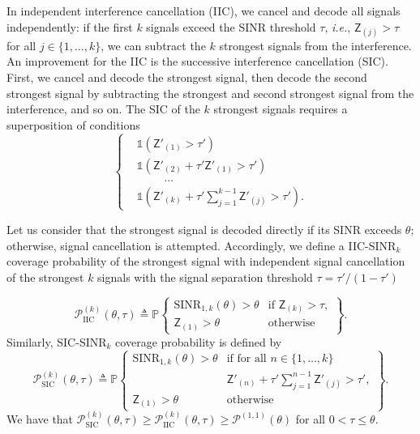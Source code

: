 \documentclass[lettersize,journal]{IEEEtran}
\begin{document}
In independent interference cancellation (IIC), we cancel and decode all signals independently: if the first $k$ signals exceed the SINR threshold $\tau$, \textit{i.e.}, $\mathsf{Z}_{(j)} > \tau$ for all $j \in \{1,\dots,k\}$, we can subtract the $k$ strongest signals from the interference. An improvement for the IIC is the successive interference cancellation (SIC). First, we cancel and decode the strongest signal, then decode the second strongest signal by subtracting the strongest and second strongest signal from the interference, and so on. The SIC of the $k$ strongest signals requires a superposition of conditions
\begin{equation}
  \label{eq:SIC-SINRcond}
  \begin{cases}
    &\mathds{1} \left(\mathsf{Z}'_{(1)} > \tau'\right)\\
    &\mathds{1}\left( \mathsf{Z}'_{(2)} + \tau' \mathsf{Z}'_{(1)}> \tau'\right) \\
    &\hspace{1cm}\dots \\
    &\mathds{1} \left(\mathsf{Z}'_{(k)} + \tau' \sum_{j=1}^{k-1}\mathsf{Z}'_{(j)}> \tau'\right).
  \end{cases}
\end{equation}


Let us consider that the strongest signal is decoded directly if its SINR exceeds $\theta$; otherwise, signal cancellation is attempted. Accordingly, we define a IIC-SINR$_{k}$ coverage probability of the strongest signal with independent signal cancellation of the strongest $k$ signals with the signal separation threshold $\tau=\tau'/(1-\tau')$ 

\begin{equation}
  \mathcal{P}^{(k)}_{\text{IIC}}(\theta,\tau) \triangleq \mathbb{P}\begin{Bmatrix} \text{SINR}_{1,k}(\theta)>\theta & \text{if } \mathsf{Z}_{(k)}>\tau, \\
\mathsf{Z}_{(1)}>\theta & \text{otherwise} \end{Bmatrix}.
\end{equation}
Similarly, SIC-SINR$_{k}$ coverage probability is defined by
\begin{equation}
  \label{eq:SIC-SINRprob}
  \mathcal{P}^{(k)}_{\text{SIC}}(\theta,\tau) \triangleq \mathbb{P}\begin{Bmatrix} \text{SINR}_{1,k}(\theta)>\theta & \text{if for all }n\in\{1,\dots,k\}  \\
    & \mathsf{Z}'_{(n)}+\tau'\sum\limits_{j=1}^{n-1}\mathsf{Z}'_{(j)}>\tau',\\
\mathsf{Z}_{(1)}>\theta & \text{otherwise} \end{Bmatrix}.
\end{equation}
We have that $\mathcal{P}^{(k)}_{\text{SIC}}(\theta,\tau)\geq \mathcal{P}^{(k)}_{\text{IIC}}(\theta,\tau) \geq \mathcal{P}^{(1,1)}(\theta)$ for all $0<\tau \leq \theta$. 
\end{document}
